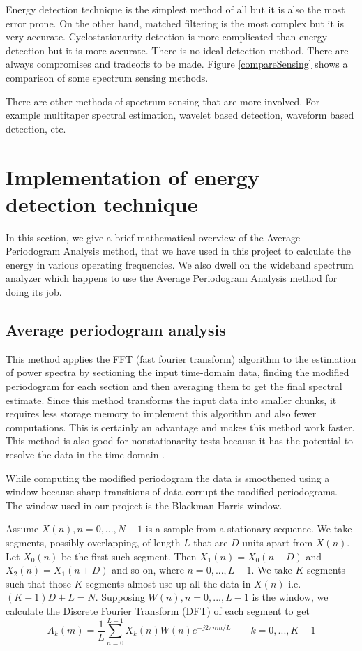 Energy detection technique is the simplest method of all but it is also the 
most error prone. On the other hand, matched filtering is the most complex but 
it is very accurate. Cyclostationarity detection is more complicated than 
energy detection but it is more accurate. There is no ideal detection method.
There are always compromises and tradeoffs to be made. Figure 
\ref{compareSensing} shows a comparison of some spectrum sensing methods.

There are other methods of spectrum sensing that are more involved. For
example multitaper spectral estimation, wavelet based detection, waveform
based detection, etc.


\section{Implementation of energy detection technique}

In this section, we give a brief mathematical overview of the Average 
Periodogram Analysis method, that we have used in this project to calculate 
the energy in various operating frequencies. We also dwell on the wideband 
spectrum analyzer which happens to use the Average Periodogram Analysis 
method for doing its job.

\subsection{Average periodogram analysis}
This method applies the FFT (fast fourier transform) algorithm to the 
estimation of power spectra by sectioning the input time-domain data, finding
the modified periodogram for each section and then averaging them to get the
final spectral estimate. Since this method transforms the input data into 
smaller chunks, it requires less storage memory to implement this algorithm 
and also fewer computations. This is certainly an advantage and makes this 
method work faster. This method is also good for nonstationarity tests because
it has the potential to resolve the data in the time domain \cite{welch67}.

While computing the modified periodogram the data is smoothened using a window
because sharp transitions of data corrupt the modified periodograms. The 
window used in our project is the Blackman-Harris window.

Assume $X(n), n=0, ..., N-1$ is a sample from a stationary sequence. We take
segments, possibly overlapping, of length $L$ that are $D$ units apart from 
$X(n)$. Let $X_0(n)$ be the first such segment. Then $X_1(n) = X_0(n+D)$ and
$X_2(n) = X_1(n+D)$ and so on, where $n=0, ..., L-1$. We take $K$ segments
such that those $K$ segments almost use up all the data in $X(n)$ i.e.
$ (K-1)D + L = N$. Supposing $W(n), n=0, ..., L-1$ is the window, we calculate
the Discrete Fourier Transform (DFT) of each segment to get
\begin{equation*}
    A_k(m) = \frac{1}{L}\sum_{n=0}^{L-1}X_k(n)W(n)e^{-j2\pi nm/L} \qquad
    k = 0, ..., K-1
\end{equation*}

